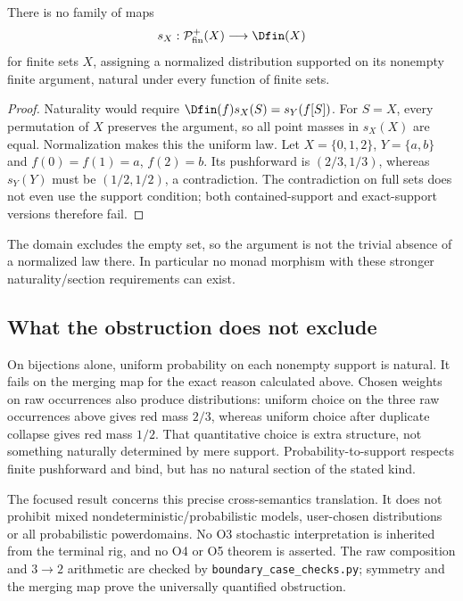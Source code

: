 \begin{theorem}
There is no family of maps
\[
s_X:\mathcal P_{\rm fin}^{+}(X)\longrightarrow\Dfin(X)
\]
for finite sets $X$, assigning a normalized distribution supported on
its nonempty finite argument, natural under every function of finite sets.
\end{theorem}
\begin{proof}
Naturality would require
$\Dfin(f)s_X(S)=s_Y(f[S])$. For $S=X$, every permutation of $X$
preserves the argument, so all point masses in $s_X(X)$ are equal.
Normalization makes this the uniform law. Let $X=\{0,1,2\}$,
$Y=\{a,b\}$ and $f(0)=f(1)=a$, $f(2)=b$. Its pushforward is
$(2/3,1/3)$, whereas $s_Y(Y)$ must be $(1/2,1/2)$, a contradiction.
The contradiction on full sets does not even use the support condition;
both contained-support and exact-support versions therefore fail.
\end{proof}
The domain excludes the empty set, so the argument is not the trivial
absence of a normalized law there. In particular no monad morphism
with these stronger naturality/section requirements can exist.

\subsection{What the obstruction does not exclude}
On bijections alone, uniform probability on each nonempty support is
natural. It fails on the merging map for the exact reason calculated
above. Chosen weights on raw occurrences also produce distributions:
uniform choice on the three raw occurrences above gives red mass $2/3$,
whereas uniform choice after duplicate collapse gives red mass $1/2$.
That quantitative choice is extra structure, not something naturally
determined by mere support. Probability-to-support respects finite
pushforward and bind, but has no natural section of the stated kind.

The focused result concerns this precise cross-semantics translation.
It does not prohibit mixed nondeterministic/probabilistic models,
user-chosen distributions or all probabilistic powerdomains. No O3
stochastic interpretation is inherited from the terminal rig, and no O4
or O5 theorem is asserted. The raw composition and $3\to2$ arithmetic
are checked by \texttt{boundary\_case\_checks.py}; symmetry and the
merging map prove the universally quantified obstruction.

